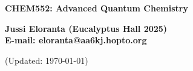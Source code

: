 \documentclass[serif]{beamer}
\begin{document}
\phantom{hauki}
\vfill
\begin{center}
\textbf{CHEM552: Advanced Quantum Chemistry}\\

\vspace{1cm}

\textbf{Jussi Eloranta (Eucalyptus Hall 2025)}\\
\textbf{E-mail: eloranta@aa6kj.hopto.org}\\

\vspace{1cm}


\vspace{1cm}

{\tiny (Updated: \today)}

\end{center}
\vfill
\newpage










\end{document}
